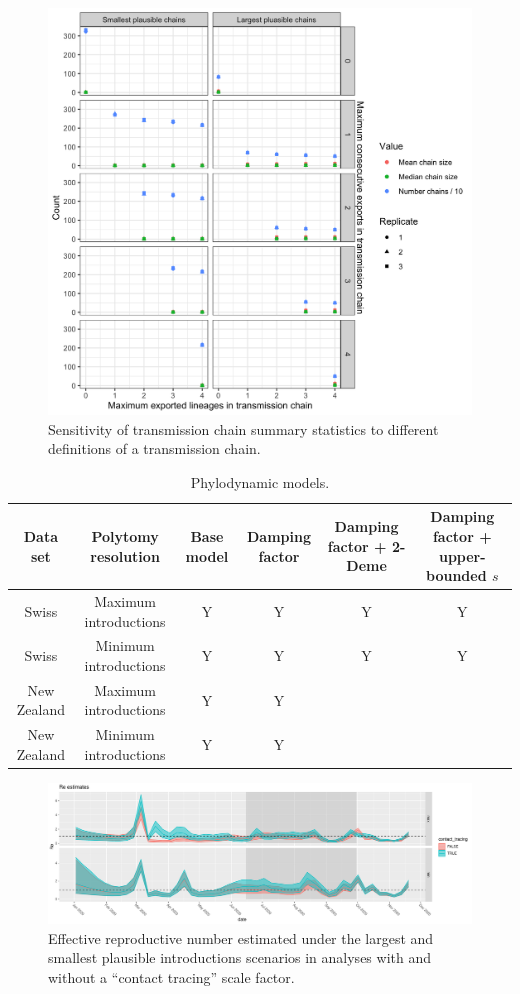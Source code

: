 \documentclass[9pt,twoside,lineno]{pnas-new}
\begin{document}
\begin{figure}
\centering
\includegraphics[width = 11.4cm]{figures/fig_SX_sensitivity_chain_defn.png}
\caption{Sensitivity of transmission chain summary statistics to different definitions of a transmission chain.}  
\label{fig:sensitivity_m_p}
\end{figure}

\newpage
\begin{table}
\caption{Phylodynamic models.}
\label{tab:phylo-models}
\begin{tabular}{cccccc}
Data set & Polytomy resolution & Base model & Damping factor & Damping factor + 2-Deme & Damping factor + upper-bounded $s$ \\
\midrule
Swiss & Maximum introductions & Y & Y & Y & Y \\
Swiss & Minimum introductions & Y & Y & Y & Y \\
New Zealand & Maximum introductions & Y & Y & & \\
New Zealand & Minimum introductions & Y & Y & & \\
\bottomrule
\end{tabular}
\end{table}

\begin{figure}[tbhp]
\centering
\includegraphics[width=.8\linewidth]{figures/Re_noSampUB.pdf}
\caption{Effective reproductive number estimated under the largest and smallest plausible introductions scenarios in analyses with and without a ``contact tracing'' scale factor.}  
\label{fig:re}
\end{figure}
\end{document}

